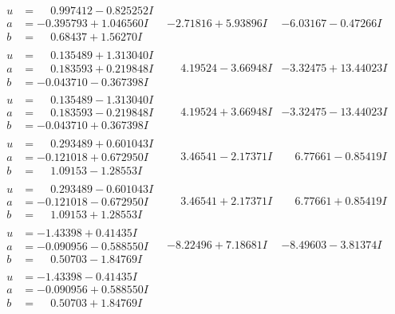 \documentclass[1p]{elsarticle_modified}
\theoremstyle{definition}
\begin{document}
$$\begin{array}{c|c|c}
\begin{aligned}
u &= \phantom{-}0.997412 - 0.825252 I \\
a &= -0.395793 + 1.046560 I \\
b &= \phantom{-}0.68437 + 1.56270 I\end{aligned}
 & -2.71816 + 5.93896 I & -6.03167 - 0.47266 I \\ \hline\begin{aligned}
u &= \phantom{-}0.135489 + 1.313040 I \\
a &= \phantom{-}0.183593 + 0.219848 I \\
b &= -0.043710 - 0.367398 I\end{aligned}
 & \phantom{-}4.19524 - 3.66948 I & -3.32475 + 13.44023 I \\ \hline\begin{aligned}
u &= \phantom{-}0.135489 - 1.313040 I \\
a &= \phantom{-}0.183593 - 0.219848 I \\
b &= -0.043710 + 0.367398 I\end{aligned}
 & \phantom{-}4.19524 + 3.66948 I & -3.32475 - 13.44023 I \\ \hline\begin{aligned}
u &= \phantom{-}0.293489 + 0.601043 I \\
a &= -0.121018 + 0.672950 I \\
b &= \phantom{-}1.09153 - 1.28553 I\end{aligned}
 & \phantom{-}3.46541 - 2.17371 I & \phantom{-}6.77661 - 0.85419 I \\ \hline\begin{aligned}
u &= \phantom{-}0.293489 - 0.601043 I \\
a &= -0.121018 - 0.672950 I \\
b &= \phantom{-}1.09153 + 1.28553 I\end{aligned}
 & \phantom{-}3.46541 + 2.17371 I & \phantom{-}6.77661 + 0.85419 I \\ \hline\begin{aligned}
u &= -1.43398 + 0.41435 I \\
a &= -0.090956 - 0.588550 I \\
b &= \phantom{-}0.50703 - 1.84769 I\end{aligned}
 & -8.22496 + 7.18681 I & -8.49603 - 3.81374 I \\ \hline\begin{aligned}
u &= -1.43398 - 0.41435 I \\
a &= -0.090956 + 0.588550 I \\
b &= \phantom{-}0.50703 + 1.84769 I\end{aligned}

\end{array}$$
\end{document}
